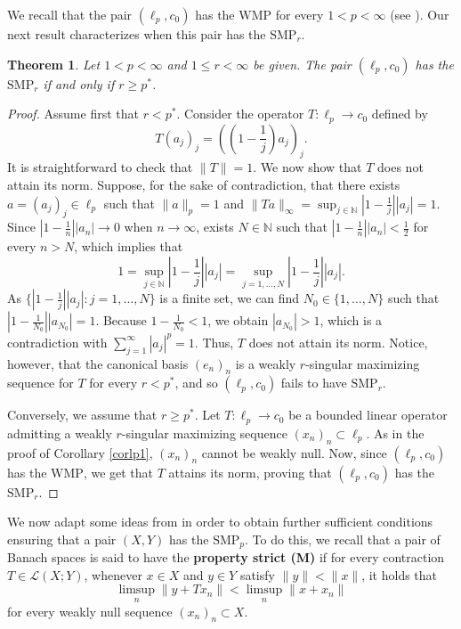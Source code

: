 \documentclass[12 pt]{article}%
\newtheorem{theorem}{Theorem}[section]
\newtheorem{final remark}[theorem]{Final Remark}
\newcommand {\N} {\mathbb{N}}
\newcommand{\norma}[1]{\| #1 \|}
\begin{document}
We recall that the pair $(\ell_p, c_0)$ has the $\mathrm{WMP}$ for every $1 < p < \infty$ (see \cite{garcia-lirola}). Our next result characterizes when this pair has the $\mathrm{SMP}_r$.



\begin{theorem} \label{teoc0}
    Let $1 < p < \infty$ and $1 \leq r < \infty$ be given.
    The pair $(\ell_p, c_0)$ has the $\mathrm{SMP}_r$ if and only if $r \geq p^*$.
\end{theorem}

\begin{proof}
    Assume first that $r < p^*$. Consider the operator  $T: \ell_{p}\to c_{0}$ defined by $$T(a_j)_j=((1-\frac{1}{j})a_{j})_j. $$ It is straightforward to check that $\norma{T} = 1$. We now show that $T$ does not attain its norm. Suppose, for the sake of contradiction, that there exists $a = (a_j)_j \in \ell_p$ such that $\norma{a}_p = 1$ and $\norma{Ta}_\infty = \displaystyle \sup_{j \in \N} |1 - \frac{1}{j}||a_j| = 1$. Since $\displaystyle |1 - \frac{1}{n}||a_n| \to 0$ when $n \to \infty$, exists $N \in \N$ such that $\displaystyle |1 - \frac{1}{n}||a_n| < \frac{1}{2}$ for every $n > N$, which implies that    $$ 1 = \displaystyle \sup_{j \in \N} |1 - \frac{1}{j}||a_j| = \sup_{j = 1,\dots, N} |1 - \frac{1}{j}||a_j|. $$  
      As $\{ |1 - \frac{1}{j}||a_j|: j = 1, \dots, N \}$ is a finite set, we can find $N_0 \in \{1, \dots, N\}$ such that $\displaystyle |1 - \frac{1}{N_0}||a_{N_0}| = 1$. Because $1 - \frac{1}{N_0} < 1$, we obtain $|a_{N_0}| > 1$, which is a contradiction with $\displaystyle \sum_{j=1}^\infty |a_j|^p = 1$. Thus, $T$ does not attain its norm. Notice, however, that the canonical basis  $(e_n)_n$ is a weakly $r$-singular maximizing sequence for $T$ for every $r < p^*$, and so $(\ell_{p},c_{0})$ fails to have $\mathrm{SMP}_r$.

      Conversely, we assume that $r \geq  p^*$.  Let $T: \ell_p \to c_0$ be a bounded linear operator admitting a weakly $r$-singular maximizing sequence $(x_n)_n \subset \ell_p$.
      As in the proof of Corollary \ref{corlp1}, $(x_n)_n$ cannot be weakly null. Now, since $(\ell_p, c_0)$ has the $\mathrm{WMP}$, we get that $T$ attains its norm, proving that $(\ell_p, c_0)$ has the $\mathrm{SMP}_r$.
\end{proof}




We now adapt some ideas from \cite{han} in order to obtain further sufficient conditions ensuring that a pair $(X,Y)$ has the $\mathrm{SMP}_p$. To do this, we recall that a pair of Banach spaces is said to have the {\bf property strict (M)} if for every contraction $T \in \mathcal{L}(X; Y)$, whenever $x\in X$ and $y \in Y$ satisfy $\norma{y} < \norma{x}$, it holds that $$ \limsup_{n} \norma{y + Tx_n} < \limsup_{n} \norma{x+x_n} $$
for every weakly null sequence $(x_n)_n \subset X$.
\end{document}

